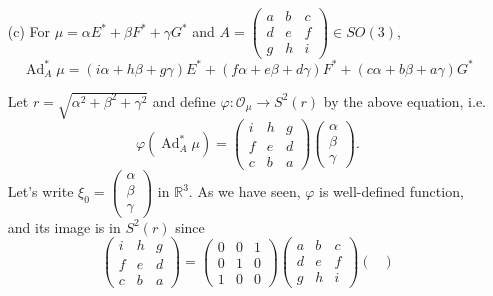 \documentclass[a4paper, 12pt]{article}
\theoremstyle{Mydefinition}
\theoremstyle{Mytheorem}
\DeclareMathOperator{\Ad}{Ad}
\begin{document}
\begin{enumerate}
\item[(c)] For $\mu = \alpha E^*+\beta F^*+\gamma G^*$ and $A=\begin{pmatrix}
        a & b & c\\
        d & e & f\\
        g & h & i
    \end{pmatrix}\in \mathit{SO}(3)$,
\begin{equation*}
    \Ad^*_{A} \mu= (i\alpha+h\beta+g\gamma)E^*+(f\alpha+e\beta+d\gamma)F^*+(c\alpha+b\beta+a\gamma)G^*
\end{equation*}

Let $r = \sqrt{\alpha^2+\beta^2+\gamma^2}$ and define $\varphi:\mathcal{O}_\mu\rightarrow S^2(r)$ by the above equation, i.e.
\begin{equation*}
    \varphi(\Ad_A^*\mu) = \begin{pmatrix}
        i & h & g\\
        f & e & d\\
        c & b & a
    \end{pmatrix}\begin{pmatrix}
        \alpha\\ \beta\\ \gamma
    \end{pmatrix}.
\end{equation*}
Let's write $\xi_0 = \begin{pmatrix}
    \alpha\\ \beta\\ \gamma
\end{pmatrix}$ in $\mathbb{R}^3$. As we have seen, $\varphi$ is well-defined function, and its image is in $S^2(r)$ since
\begin{equation*}
    \begin{pmatrix}
        i & h & g\\
        f & e & d\\
        c & b & a
    \end{pmatrix} = \begin{pmatrix}
        0 & 0 & 1\\
        0 & 1 & 0\\
        1 & 0 & 0
    \end{pmatrix}
    \begin{pmatrix}
        a & b & c\\
        d & e & f\\
        g & h & i
    \end{pmatrix}
    \begin{pmatrix}

\end{pmatrix}
\end{equation*}
\end{enumerate}
\end{document}
